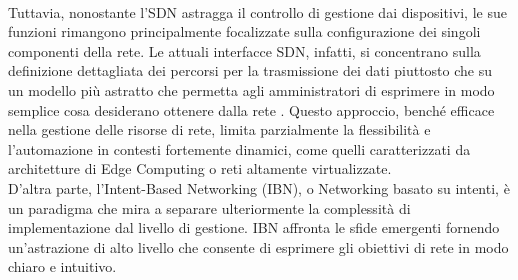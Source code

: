 \\Tuttavia, nonostante l’SDN astragga il controllo di gestione dai dispositivi, le sue funzioni rimangono principalmente focalizzate sulla configurazione dei singoli componenti della rete. Le attuali interfacce SDN, infatti, si concentrano sulla definizione dettagliata dei percorsi per la trasmissione dei dati 
piuttosto che su un modello più astratto che permetta agli amministratori di esprimere in modo semplice cosa desiderano ottenere dalla rete \cite{sdnart}. 
Questo approccio, benché efficace nella gestione delle risorse di rete, limita parzialmente la flessibilità e l'automazione in contesti fortemente dinamici, come quelli caratterizzati da architetture di Edge Computing o reti altamente virtualizzate.
\\D'altra parte, l’Intent-Based Networking (IBN), o Networking basato su intenti, è un paradigma che mira a separare ulteriormente la complessità di implementazione dal livello di gestione. 
IBN affronta le sfide emergenti fornendo un'astrazione di alto livello che consente di esprimere gli obiettivi di rete in modo chiaro e intuitivo.  
